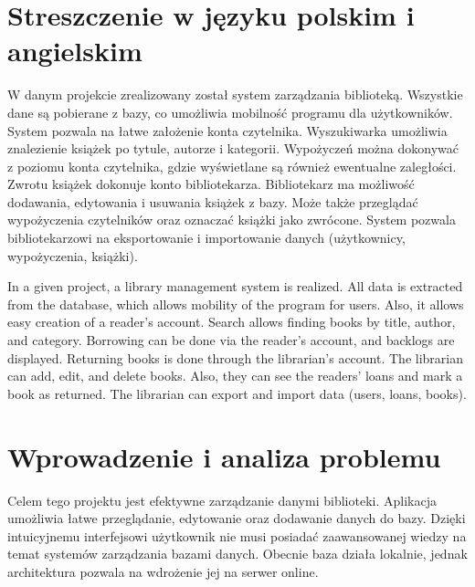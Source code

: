\chapter{Streszczenie w języku polskim i angielskim}
\label{cha:Lab001}
\makeatletter

W danym projekcie zrealizowany został system zarządzania biblioteką. Wszystkie dane są pobierane z bazy, co umożliwia mobilność programu dla użytkowników. System pozwala na łatwe założenie konta czytelnika. Wyszukiwarka umożliwia znalezienie książek po tytule, autorze i kategorii. Wypożyczeń można dokonywać z poziomu konta czytelnika, gdzie wyświetlane są również ewentualne zaległości. Zwrotu książek dokonuje konto bibliotekarza. Bibliotekarz ma możliwość dodawania, edytowania i usuwania książek z bazy. Może także przeglądać wypożyczenia czytelników oraz oznaczać książki jako zwrócone. System pozwala bibliotekarzowi na eksportowanie i importowanie danych (użytkownicy, wypożyczenia, książki).\bigskip

In a given project, a library management system is realized. All data is extracted from the database, which allows mobility of the program for users. Also, it allows easy creation of a reader's account. Search allows finding books by title, author, and category. Borrowing can be done via the reader's account, and backlogs are displayed. Returning books is done through the librarian's account. The librarian can add, edit, and delete books. Also, they can see the readers' loans and mark a book as returned. The librarian can export and import data (users, loans, books).


\chapter{Wprowadzenie i analiza problemu}
Celem tego projektu jest efektywne zarządzanie danymi biblioteki. Aplikacja umożliwia łatwe przeglądanie, edytowanie oraz dodawanie danych do bazy. Dzięki intuicyjnemu interfejsowi użytkownik nie musi posiadać zaawansowanej wiedzy na temat systemów zarządzania bazami danych. Obecnie baza działa lokalnie, jednak architektura pozwala na wdrożenie jej na serwer online. 

